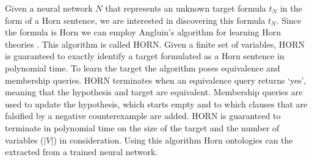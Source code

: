 Given a neural network $N$ that represents an unknown target formula $t_N$ in the form of a Horn sentence, we are interested in discovering this formula $t_N$. Since the formula is Horn we can employ Angluin's algorithm for learning Horn theories \cite{DBLP:journals/ml/AngluinFP92}. This algorithm is called HORN. Given a finite set of variables, HORN is guaranteed to exactly identify a target formulated as a Horn sentence in polynomial time. To learn the target the algorithm poses equivalence and membership queries. HORN terminates when an equivalence query returns `yes', meaning that the hypothesis and target are equivalent. Membership queries are used to update the hypothesis, which starts empty and to which clauses that are falsified by a negative counterexample are added. HORN is guaranteed to terminate in polynomial time on the size of the target and the number of variables ($|V|$) in consideration. Using this algorithm Horn ontologies can the extracted from a trained neural network.

